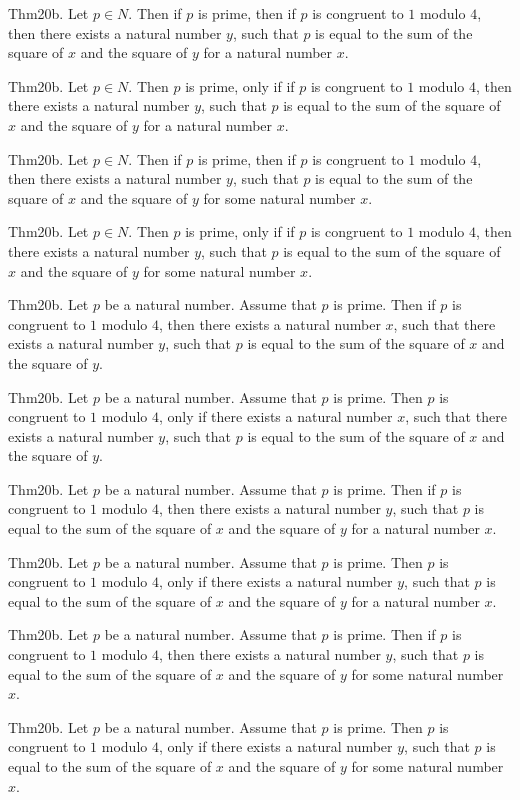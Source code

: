 \documentclass{article}
\begin{document}
Thm20b. Let $p \in N$. Then if $p$ is prime, then if $p$ is congruent to $1$ modulo $4$, then there exists a natural number $y$, such that $p$ is equal to the sum of the square of $x$ and the square of $y$ for a natural number $x$.

Thm20b. Let $p \in N$. Then $p$ is prime, only if if $p$ is congruent to $1$ modulo $4$, then there exists a natural number $y$, such that $p$ is equal to the sum of the square of $x$ and the square of $y$ for a natural number $x$.

Thm20b. Let $p \in N$. Then if $p$ is prime, then if $p$ is congruent to $1$ modulo $4$, then there exists a natural number $y$, such that $p$ is equal to the sum of the square of $x$ and the square of $y$ for some natural number $x$.

Thm20b. Let $p \in N$. Then $p$ is prime, only if if $p$ is congruent to $1$ modulo $4$, then there exists a natural number $y$, such that $p$ is equal to the sum of the square of $x$ and the square of $y$ for some natural number $x$.

Thm20b. Let $p$ be a natural number. Assume that $p$ is prime. Then if $p$ is congruent to $1$ modulo $4$, then there exists a natural number $x$, such that there exists a natural number $y$, such that $p$ is equal to the sum of the square of $x$ and the square of $y$.

Thm20b. Let $p$ be a natural number. Assume that $p$ is prime. Then $p$ is congruent to $1$ modulo $4$, only if there exists a natural number $x$, such that there exists a natural number $y$, such that $p$ is equal to the sum of the square of $x$ and the square of $y$.

Thm20b. Let $p$ be a natural number. Assume that $p$ is prime. Then if $p$ is congruent to $1$ modulo $4$, then there exists a natural number $y$, such that $p$ is equal to the sum of the square of $x$ and the square of $y$ for a natural number $x$.

Thm20b. Let $p$ be a natural number. Assume that $p$ is prime. Then $p$ is congruent to $1$ modulo $4$, only if there exists a natural number $y$, such that $p$ is equal to the sum of the square of $x$ and the square of $y$ for a natural number $x$.

Thm20b. Let $p$ be a natural number. Assume that $p$ is prime. Then if $p$ is congruent to $1$ modulo $4$, then there exists a natural number $y$, such that $p$ is equal to the sum of the square of $x$ and the square of $y$ for some natural number $x$.

Thm20b. Let $p$ be a natural number. Assume that $p$ is prime. Then $p$ is congruent to $1$ modulo $4$, only if there exists a natural number $y$, such that $p$ is equal to the sum of the square of $x$ and the square of $y$ for some natural number $x$.
\end{document}
